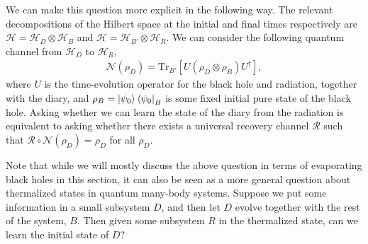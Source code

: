\documentclass[a4paper,11pt]{article}
\newcommand\sH{{\ensuremath{{\mathcal H}}}}
\newcommand\sN{{\ensuremath{{\mathcal N}}}}
\newcommand\sR{{\mathcal R}}
\newcommand{\Tr}{\text{Tr}}
\begin{document}
\begin{enumerate}
We can make this question more explicit in the following way. The relevant decompositions of the Hilbert space at the initial and final times respectively are $\sH= \sH_D \otimes \sH_B$ and $\sH= \sH_{B'} \otimes \sH_R$. We can consider the following quantum channel from $\sH_D$ to $\sH_R$, 
\begin{align} \label{n_channel}
 \mathcal{N}(
 \rho_D) = \Tr_{B'}\left[ U \left(\rho_D \otimes \rho_B \right)U^{\dagger} \right],
\end{align}
where $U$ is the time-evolution operator for the black hole and radiation, together with the diary, and $\rho_B = \ket{\psi_0}\bra{\psi_0}_B$ is some fixed initial pure state of the black hole. Asking whether we can learn the state of the diary from the radiation is equivalent to asking whether there exists a universal recovery channel $\sR$ such that $\sR \circ \sN (\rho_D) = \rho_D$ for all $\rho_D$.

Note that while we will mostly discuss the above question in terms of evaporating black holes in this section, it can also be seen as a more general question about thermalized states in quantum many-body systems. Suppose we put some information in a small subsystem $D$, and then let $D$ evolve together with the rest of the system, $B$. Then given some subsystem $R$ in the thermalized state, can we learn the initial state of $D$? 


\end{enumerate}
\end{document}
